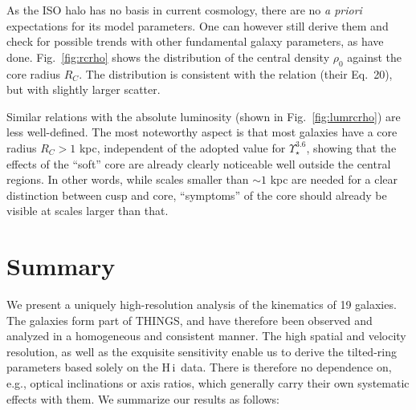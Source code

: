 \documentclass[usenatbib,usegraphicx,apjfonts,floatfix]{emulateapj}
\newcommand{\HI}{H\,{\sc i}}
\newcommand{\Ups}{\ensuremath{\Upsilon_{\star}^{3.6}}}
\begin{document}
As the ISO halo has no basis in current cosmology, there are no
\emph{a priori} expectations for its model parameters. One can however
still derive them and check for possible trends with other fundamental
galaxy parameters, as \citet{kormendyfreeman} have done.
Fig.~\ref{fig:rcrho} shows the distribution of the central density
$\rho_0$ against the core radius $R_C$.  The distribution is
consistent with the \citet{kormendyfreeman} relation (their Eq.~20),
but with slightly larger scatter.

Similar relations with the absolute luminosity (shown in
Fig.~\ref{fig:lumrcrho}) are less well-defined.  The most noteworthy
aspect is that most galaxies have a core radius $R_C>1$ kpc,
independent of the adopted value for \Ups, showing that the effects of
the ``soft'' core are already clearly noticeable well outside the
central regions.  In other words, while scales smaller than $\sim 1$
kpc are needed for a clear distinction between cusp and core,
``symptoms'' of the core should already be visible at scales larger
than that.


\section{Summary}

We present a uniquely high-resolution analysis of the kinematics of 19
galaxies. The galaxies form part of THINGS, and have therefore been
observed and analyzed in a homogeneous and consistent manner.  The high
spatial and velocity resolution, as well as the exquisite sensitivity
enable us to derive the tilted-ring parameters based solely on the
\HI\ data.  There is therefore no dependence on, e.g., optical
inclinations or axis ratios, which generally carry their own
systematic effects with them.  We summarize our results as follows:
\end{document}
